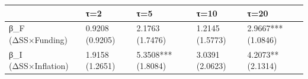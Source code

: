 \begin{tabular}{lllll}
\toprule
 & τ=2 & τ=5 & τ=10 & τ=20 \\
\midrule
β_F (ΔSS×Funding) & 0.9208
(0.9205) & 2.1763
(1.7476) & 1.2145
(1.5773) & 2.9667***
(1.0846) \\
β_I (ΔSS×Inflation) & 1.9158
(1.2651) & 5.3508***
(1.8084) & 3.0391
(2.0623) & 4.2073**
(2.1314) \\
\bottomrule
\end{tabular}
